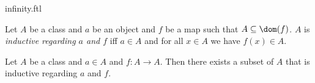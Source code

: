 \documentclass{naproche-library}
\begin{document}
\begin{smodule}[title=The Infinity Axiom]{infinity.ftl}

\begin{definition}[forthel,id=FOUNDATIONS_10_298374925738210]
  Let $A$ be a class and $a$ be an object and $f$ be a map such that $A \subseteq \dom(f)$.
  $A$ is \emph{inductive regarding $a$ and $f$} iff $a \in A$ and for all $x \in A$ we have $f(x) \in A$.
\end{definition}

\begin{axiom}[forthel,title=Infinity Axiom,id=FOUNDATIONS_10_367388832825344]
  Let $A$ be a class and $a \in A$ and $f : A \to A$.
  Then there exists a subset of $A$ that is inductive regarding $a$ and $f$.
\end{axiom}
\end{smodule}
\end{document}
